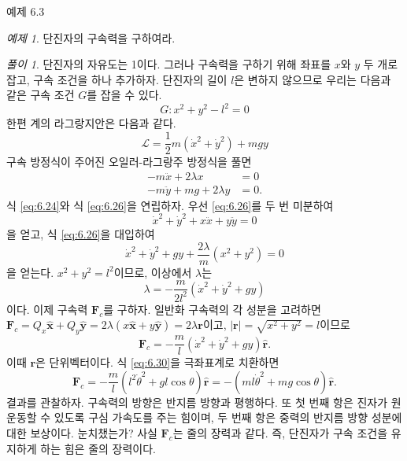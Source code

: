 \documentclass[chapter, oneside, b5paper]{oblivoir}
\theoremstyle{plain}
\theoremstyle{definition}
\theoremstyle{remark}
\newtheorem{example}{예제}[chapter]    %
\newtheorem*{solution}{풀이}
\begin{document}
\begin{examplebox}{예제 6.3}
\begin{example}
단진자의 구속력을 구하여라.
\end{example}
\end{examplebox}

\begin{solution}
    단진자의 자유도는 1이다. 그러나 구속력을 구하기 위해 좌표를 $x$와 $y$ 두 개로 잡고, 구속 조건을 하나 추가하자. 단진자의 길이 $l$은 변하지 않으므로 우리는 다음과 같은 구속 조건 $G$를 잡을 수 있다.
    \begin{equation}
        G : x^2 + y^2 - l^2 = 0
        \label{eq:6.24}
    \end{equation}
    한편 계의 라그랑지안은 다음과 같다.
    \begin{equation}
        \mathcal{L} = \frac{1}{2}m(\dot{x}^2 + \dot{y}^2) + mgy
    \end{equation}
    구속 방정식이 주어진 오일러-라그랑주 방정식을 풀면
    \begin{equation}
        \begin{aligned}
            -m\ddot{x} +2\lambda x &= 0 \\
            -m\ddot{y} +mg+2\lambda y &= 0.
        \end{aligned}
        \label{eq:6.26}
    \end{equation}
    식 \ref{eq:6.24}와 식 \ref{eq:6.26}을 연립하자. 우선 \ref{eq:6.26}를 두 번 미분하여
    \begin{equation}
        \dot{x}^2 + \dot{y}^2 +x\ddot{x} + y\ddot{y} = 0
    \end{equation}
    을 얻고, 식 \ref{eq:6.26}을 대입하여
    \begin{equation}
        \dot{x}^2 + \dot{y}^2 + gy + \frac{2\lambda}{m}(x^2+y^2) = 0
    \end{equation}
    을 얻는다. $x^2+y^2=l^2$이므로, 이상에서 $\lambda$는
    \begin{equation}
        \lambda = -\frac{m}{2l^2}(\dot{x}^2 + \dot{y}^2 + gy)
    \end{equation}
    이다. 이제 구속력 $\textbf{F}_c$를 구하자. 일반화 구속력의 각 성분을 고려하면 $\textbf{F}_c = Q_x \mathbf{\hat{x}} + Q_y\mathbf{\hat{y}} = 2\lambda (x \mathbf{\hat{x}}+ y\mathbf{\hat{y}}) = 2\lambda \mathbf{r}$이고, $|\mathbf{r}| = \sqrt{x^2+y^2} = l$이므로
    \begin{equation}
    \textbf{F}_c = -\frac{m}{l}(\dot{x}^2 + \dot{y}^2 + gy)\mathbf{\hat{r}}. \label{eq:6.30}
    \end{equation}
    이때 $\mathbf{r}$은 단위벡터이다. 식 \ref{eq:6.30}을 극좌표계로 치환하면
    \begin{equation}
        \textbf{F}_c = -\frac{m}{l}(l^2 \dot{\theta}^2 + gl\cos{\theta})\mathbf{\hat{r}} = -(ml\dot{\theta}^2 + mg\cos{\theta})\mathbf{\hat{r}}.
    \end{equation}
    결과를 관찰하자. 구속력의 방향은 반지름 방향과 평행하다. 또 첫 번째 항은 진자가 원운동할 수 있도록 구심 가속도를 주는 힘이며, 두 번째 항은 중력의 반지름 방향 성분에 대한 보상이다. 눈치챘는가? 사실 $\mathbf{F}_c$는 줄의 장력과 같다. 즉, 단진자가 구속 조건을 유지하게 하는 힘은 줄의 장력이다.
\end{solution}
\end{document}
